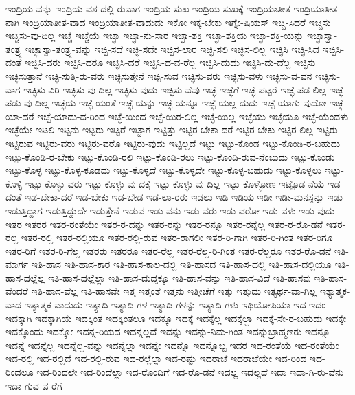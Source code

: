 {ಇಂದ್ರಿಯ-ವನ್ನು
ಇಂದ್ರಿಯ-ವಶ-ದಲ್ಲಿ-ರುವಾಗ
ಇಂದ್ರಿಯ-ಸುಖ
ಇಂದ್ರಿಯ-ಸುಖಕ್ಕೆ
ಇಂದ್ರಿಯಾತೀತ
ಇಂದ್ರಿಯಾತೀತ-ನಾಗಿ
ಇಂದ್ರಿಯಾತೀತ-ವಾದ
ಇಂದ್ರಿಯಾತೀತ-ವಾದುದು
ಇಕೋ
ಇಕ್ಕ-ಬೇಕು
ಇಗ್ನೇ-ಷಿಯಸ್
ಇಚ್ಚಿ-ಸಿದರೆ
ಇಚ್ಚಿಸು
ಇಚ್ಚಿಸು-ವು-ದಿಲ್ಲ
ಇಚ್ಚೆ
ಇಚ್ಚೆಯೆ
ಇಚ್ಛಾ
ಇಚ್ಛಾ-ನು-ಸಾರ
ಇಚ್ಛಾ-ಶಕ್ತಿ
ಇಚ್ಛಾ-ಶಕ್ತಿಯ
ಇಚ್ಛಾ-ಶಕ್ತಿ-ಯನ್ನು
ಇಚ್ಛಾಸ್ವಾ-ತಂತ್ರ್ಯ
ಇಚ್ಛಾಸ್ವಾ-ತಂತ್ರ್ಯ-ವನ್ನು
ಇಚ್ಛಿ-ಸದೆ
ಇಚ್ಛಿ-ಸದೇ
ಇಚ್ಛಿಸ-ಲಾರ
ಇಚ್ಛಿ-ಸಲಿ
ಇಚ್ಛಿಸ-ಲಿಲ್ಲ
ಇಚ್ಛಿಸಿ
ಇಚ್ಛಿ-ಸಿದ
ಇಚ್ಛಿಸಿ-ದಂತೆ
ಇಚ್ಛಿಸಿ-ದರು
ಇಚ್ಛಿಸಿ-ದರೂ
ಇಚ್ಛಿಸಿ-ದರೆ
ಇಚ್ಛಿಸಿ-ದ-ವ-ರೆಲ್ಲ
ಇಚ್ಛಿಸಿ-ದುದು
ಇಚ್ಛಿಸಿ-ದು-ದೆಲ್ಲ
ಇಚ್ಛಿಸು
ಇಚ್ಛಿಸುತ್ತಾನೆ
ಇಚ್ಛಿ-ಸುತ್ತಿ-ರು-ವರು
ಇಚ್ಛಿಸುತ್ತೇನೆ
ಇಚ್ಛಿ-ಸುವ
ಇಚ್ಛಿಸು-ವರು
ಇಚ್ಛಿಸು-ವಳು
ಇಚ್ಛಿಸು-ವ-ವನ
ಇಚ್ಛಿಸು-ವಾಗ
ಇಚ್ಛಿಸು-ವಿರಿ
ಇಚ್ಛಿಸು-ವು-ದಿಲ್ಲ
ಇಚ್ಛಿಸು-ವುದು
ಇಚ್ಛಿಸು-ವೆವು
ಇಚ್ಛೆ
ಇಚ್ಛೆಗೆ
ಇಚ್ಛೆ-ಪಟ್ಟರೆ
ಇಚ್ಛೆ-ಪಡ-ಲಿಲ್ಲ
ಇಚ್ಛೆ-ಪಡು-ವು-ದಿಲ್ಲ
ಇಚ್ಛೆಯ
ಇಚ್ಛೆ-ಯಂತೆ
ಇಚ್ಛೆ-ಯನ್ನು
ಇಚ್ಛೆ-ಯನ್ನೂ
ಇಚ್ಛೆ-ಯಲ್ಲ-ದುದು
ಇಚ್ಛೆ-ಯಾಗು-ವುದೋ
ಇಚ್ಛೆ-ಯಾ-ದರೆ
ಇಚ್ಛೆ-ಯಾದು-ದ-ರಿಂದ
ಇಚ್ಛೆ-ಯಿಂದ
ಇಚ್ಛೆ-ಯಿರ-ಲಿಲ್ಲ
ಇಚ್ಛೆ-ಯಿಲ್ಲ
ಇಚ್ಛೆಯು
ಇಚ್ಛೆಯೂ
ಇಚ್ಛೆ-ಯೆಂದಳು
ಇಚ್ಛೆಯೇ
ಇಟಲಿ
ಇಟ್ಟನು
ಇಟ್ಟರು
ಇಟ್ಟರೆ
ಇಟ್ಟಾಗ
ಇಟ್ಟಿತ್ತು
ಇಟ್ಟಿರ-ಬೇಕಾ-ದರೆ
ಇಟ್ಟಿರ-ಬೇಕು
ಇಟ್ಟಿರ-ಲಿಲ್ಲ
ಇಟ್ಟಿರು
ಇಟ್ಟಿರುವ
ಇಟ್ಟಿರು-ವರು
ಇಟ್ಟಿರು-ವರೊ
ಇಟ್ಟಿರು-ವುದು
ಇಟ್ಟಿಲ್ಲದೆ
ಇಟ್ಟು
ಇಟ್ಟು-ಕೊಂಡ
ಇಟ್ಟು-ಕೊಂಡಿ-ರ-ಬಹುದು
ಇಟ್ಟು-ಕೊಂಡಿ-ರ-ಬೇಕು
ಇಟ್ಟು-ಕೊಂಡಿ-ರಲಿ
ಇಟ್ಟು-ಕೊಂಡಿ-ರಲು
ಇಟ್ಟು-ಕೊಂಡಿ-ರುವ-ನೆಂಬುದು
ಇಟ್ಟು-ಕೊಂಡು
ಇಟ್ಟು-ಕೊಳ್ಳ
ಇಟ್ಟು-ಕೊಳ್ಳ-ಕೂಡದು
ಇಟ್ಟು-ಕೊಳ್ಳದೆ
ಇಟ್ಟು-ಕೊಳ್ಳದೇ
ಇಟ್ಟು-ಕೊಳ್ಳ-ಬಹುದು
ಇಟ್ಟು-ಕೊಳ್ಳಲು
ಇಟ್ಟು-ಕೊಳ್ಳಿ
ಇಟ್ಟು-ಕೊಳ್ಳು-ವರು
ಇಟ್ಟು-ಕೊಳ್ಳು-ವು-ದಕ್ಕೆ
ಇಟ್ಟು-ಕೊಳ್ಳು-ವು-ದಿಲ್ಲ
ಇಟ್ಟು-ಕೊಳ್ಳೋಣ
ಇಟ್ಟೊಡ-ನೆಯೆ
ಇಡ-ದಂತೆ
ಇಡ-ಬೇಕಾ-ದರೆ
ಇಡ-ಬೇಕು
ಇಡ-ಬೇಡ
ಇಡ-ಲಾ-ರರು
ಇಡಲು
ಇಡಿ
ಇಡಿಯ
ಇಡೀ
ಇಡೀ-ಮನಸ್ಸನ್ನು
ಇಡು
ಇಡುತ್ತಿದ್ದಾಗ
ಇಡುತ್ತಿದ್ದುದೇ
ಇಡುತ್ತೇನೆ
ಇಡುವ
ಇಡು-ವನು
ಇಡು-ವರು
ಇಡು-ವರೋ
ಇಡು-ವಳು
ಇಡು-ವುದು
ಇತರ
ಇತರರ
ಇತರ-ರಂತೆಯೇ
ಇತರ-ರ-ದನ್ನು
ಇತರ-ರನ್ನು
ಇತರ-ರನ್ನೂ
ಇತರ-ರನ್ನೆಲ್ಲ
ಇತರ-ರ-ರೊ-ಡನೆ
ಇತರ-ರಲ್ಲ
ಇತರ-ರಲ್ಲಿ
ಇತರ-ರಲ್ಲಿಯೂ
ಇತರ-ರಲ್ಲಿ-ರುವ
ಇತರ-ರಾಗಲೀ
ಇತರ-ರಿ-ಗಾಗಿ
ಇತರ-ರಿ-ಗಿಂತ
ಇತರ-ರಿಗೂ
ಇತರ-ರಿಗೆ
ಇತರ-ರಿ-ಗೆಲ್ಲ
ಇತರರು
ಇತರರೂ
ಇತರ-ರೆಲ್ಲ
ಇತರ-ರೆಲ್ಲ-ರಿ-ಗಿಂತ
ಇತರ-ರೆಲ್ಲರೂ
ಇತರ-ರೊ-ಡನೆ
ಇತಿ-ಮಾರ್ಗ
ಇತಿ-ಹಾಸ
ಇತಿ-ಹಾಸ-ಕಾರ
ಇತಿ-ಹಾಸ-ಕಾಲ-ದಲ್ಲಿ
ಇತಿ-ಹಾಸದ
ಇತಿ-ಹಾಸ-ದಲ್ಲಿ
ಇತಿ-ಹಾಸ-ದಲ್ಲಿಯೂ
ಇತಿ-ಹಾಸ-ದಲ್ಲೆಲ್ಲ
ಇತಿ-ಹಾಸ-ದಲ್ಲೆಲ್ಲಾ
ಇತಿ-ಹಾಸ-ದುದ್ದಕ್ಕೂ
ಇತಿ-ಹಾಸ-ವನ್ನು
ಇತಿ-ಹಾಸ-ವಿದೆ
ಇತಿ-ಹಾಸವು
ಇತಿ-ಹಾಸ-ವೆಂದರೆ
ಇತಿ-ಹಾಸ-ವೆಲ್ಲ
ಇತಿ-ಹಾಸವೇ
ಇತ್ತ
ಇತ್ತಂತೆ
ಇತ್ತನು
ಇತ್ತೀಚೆಗೆ
ಇತ್ತು
ಇತ್ತುದು
ಇತ್ಯರ್ಥ-ವಾ-ಗಿಲ್ಲ
ಇತ್ಯಾತ್ಮಕ-ವಾದ
ಇತ್ಯಾತ್ಮಕ-ವಾದುದು
ಇತ್ಯಾದಿ
ಇತ್ಯಾದಿ-ಗಳ
ಇತ್ಯಾದಿ-ಗಳನ್ನು
ಇತ್ಯಾದಿ-ಗಳು
ಇಥಿಯೋಪಿಯಾ
ಇದ
ಇದಂ
ಇದಕ್ಕಾಗಿ
ಇದಕ್ಕಾಗಿಯೆ
ಇದಕ್ಕಿಂತ
ಇದಕ್ಕಿಂತಲೂ
ಇದಕ್ಕೂ
ಇದಕ್ಕೆ
ಇದಕ್ಕೆಲ್ಲ
ಇದಕ್ಕೆಲ್ಲಾ
ಇದಕ್ಕೆ-ಸೇ-ರ-ಬಹುದು
ಇದಕ್ಕೇ
ಇದಕ್ಕೊಂದು
ಇದಕ್ಕೋ
ಇದನ್ನ-ರಿಯದ
ಇದನ್ನಲ್ಲದೆ
ಇದನ್ನು
ಇದನ್ನು-ನಿಮ-ಗಿಂತ
ಇದನ್ನುಬ್ರಾಹ್ಮಣರು
ಇದನ್ನೂ
ಇದನ್ನೆ
ಇದನ್ನೆಲ್ಲ
ಇದನ್ನೆಲ್ಲ-ವನ್ನು
ಇದನ್ನೆಲ್ಲಾ
ಇದನ್ನೇ
ಇದನ್ನೊ
ಇದನ್ನೊಬ್ಬ
ಇದರ
ಇದ-ರಂತೆಯೆ
ಇದ-ರಂತೆಯೇ
ಇದ-ರಲ್ಲಿ
ಇದ-ರಲ್ಲಿದೆ
ಇದ-ರಲ್ಲಿ-ರುವ
ಇದ-ರಲ್ಲೆಲ್ಲಾ
ಇದ-ರಷ್ಟು
ಇದರಾಚೆ
ಇದರಾಚೆಯೇ
ಇದ-ರಿಂದ
ಇದ-ರಿಂದಲೂ
ಇದ-ರಿಂದಲೇ
ಇದ-ರಿಂದೆಲ್ಲಾ
ಇದ-ರೊಂದಿಗೆ
ಇದ-ರೊ-ಡನೆ
ಇದಲ್ಲ
ಇದಲ್ಲದೆ
ಇದಾ
ಇದಾ-ಗಿ-ರು-ವೆನು
ಇದಾ-ಗುವ-ವ-ರೆಗೆ
}
